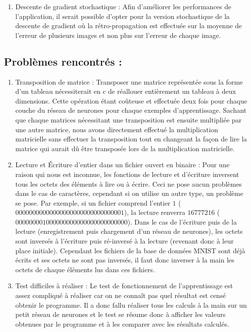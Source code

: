 \documentclass{article}
\begin{document}
\begin{enumerate}
\begin{center}
				\end{center}
			\item Descente de gradient stochastique :
			Afin d'améliorer les performances de l'application, il serait possible d'opter pour la version stochastique de la descente de gradient où la rétro-propagation est effectuée sur la moyenne de l'erreur de plusieurs images et non plus sur l'erreur de chaque image.
	\end{enumerate}

\subsection{Problèmes rencontrés :}
	\begin{enumerate}
			\item Transposition de matrice :
			Transposer une matrice représentée sous la forme d'un tableau nécessiterait en c de réallouer entièrement un tableau à deux dimensions. Cette opération étant coûteuse et effectuée deux fois pour chaque couche du réseau de neurones pour chaque exemples d'apprentissage. Sachant que chaque matrices nécessitant une transposition est ensuite multipliée par une autre matrice, nous avons directement effectué la multiplication matricielle sans effectuer la transposition tout en changeant la façon de lire la matrice qui aurait dû être transposée lors de la multiplication matricielle.
			\item Lecture et Écriture d'entier dans un fichier ouvert en binaire : 
			Pour une raison qui nous est inconnue, les fonctions de lecture et d'écriture inversent tous les octets des éléments à lire ou à écrire. Ceci ne pose aucun problèmes dans le cas de caractères, cependant si on utilise un autre type,  un problème se pose. Par exemple, si un fichier comprend l'entier $1$ ($00000000000000000000000000000001$), la lecture renverra $16777216$ ($000000001000000000000000000000000$). Dans le cas de l'écriture puis de la lecture (enregistrement puis chargement d'un réseau de neurones), les octets sont inversés à l'écriture puis ré-inversé à la lecture (revenant donc à leur place initiale).
Cependant les fichiers de la base de données MNIST sont déjà écrits et ses octets ne sont pas inversés, il faut donc inverser à la main les octets de chaque éléments lus dans ces fichiers.
			\item Test difficiles à réaliser :
			Le test de fonctionnement de l'apprentissage est assez compliqué à réaliser car on ne connaît pas quel résultat est censé obtenir le programme. Il a donc fallu réaliser tous les calculs à la main sur un petit réseau de neurones et le test se résume donc à afficher les valeurs obtenues par le programme et à les comparer avec les résultats calculés.

\end{enumerate}
\end{document}
